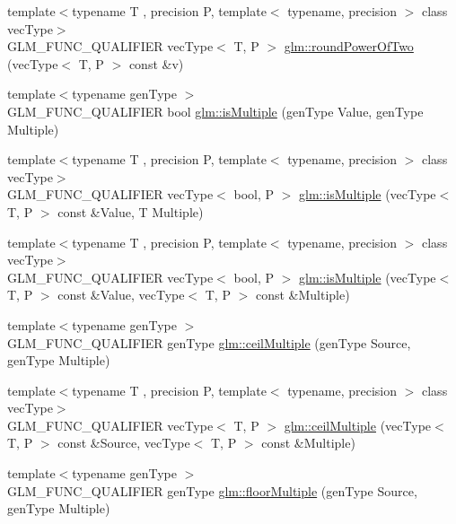 \begin{DoxyCompactItemize}
\item 
{\footnotesize template$<$typename T , precision P, template$<$ typename, precision $>$ class vec\+Type$>$ }\\G\+L\+M\+\_\+\+F\+U\+N\+C\+\_\+\+Q\+U\+A\+L\+I\+F\+I\+E\+R vec\+Type$<$ T, P $>$ \hyperlink{group__gtc__round_gae95be3b384f3bbd00c6c1cf0a1f96485}{glm\+::round\+Power\+Of\+Two} (vec\+Type$<$ T, P $>$ const \&v)
\item 
{\footnotesize template$<$typename gen\+Type $>$ }\\G\+L\+M\+\_\+\+F\+U\+N\+C\+\_\+\+Q\+U\+A\+L\+I\+F\+I\+E\+R bool \hyperlink{namespaceglm_a1749b696a2f7a956da67d67a557ae134}{glm\+::is\+Multiple} (gen\+Type Value, gen\+Type Multiple)
\item 
{\footnotesize template$<$typename T , precision P, template$<$ typename, precision $>$ class vec\+Type$>$ }\\G\+L\+M\+\_\+\+F\+U\+N\+C\+\_\+\+Q\+U\+A\+L\+I\+F\+I\+E\+R vec\+Type$<$ bool, P $>$ \hyperlink{group__gtc__round_ga50ea5d5dc33fffba39ad6002a3784123}{glm\+::is\+Multiple} (vec\+Type$<$ T, P $>$ const \&Value, T Multiple)
\item 
{\footnotesize template$<$typename T , precision P, template$<$ typename, precision $>$ class vec\+Type$>$ }\\G\+L\+M\+\_\+\+F\+U\+N\+C\+\_\+\+Q\+U\+A\+L\+I\+F\+I\+E\+R vec\+Type$<$ bool, P $>$ \hyperlink{group__gtc__round_ga7ae705574ef3e3ebfb4f537d8d285c48}{glm\+::is\+Multiple} (vec\+Type$<$ T, P $>$ const \&Value, vec\+Type$<$ T, P $>$ const \&Multiple)
\item 
{\footnotesize template$<$typename gen\+Type $>$ }\\G\+L\+M\+\_\+\+F\+U\+N\+C\+\_\+\+Q\+U\+A\+L\+I\+F\+I\+E\+R gen\+Type \hyperlink{group__gtc__round_gac84898c466e609cdd2e81d9ba907d9e8}{glm\+::ceil\+Multiple} (gen\+Type Source, gen\+Type Multiple)
\item 
{\footnotesize template$<$typename T , precision P, template$<$ typename, precision $>$ class vec\+Type$>$ }\\G\+L\+M\+\_\+\+F\+U\+N\+C\+\_\+\+Q\+U\+A\+L\+I\+F\+I\+E\+R vec\+Type$<$ T, P $>$ \hyperlink{group__gtc__round_gafe632af669ac57d670ca18e3665a12ca}{glm\+::ceil\+Multiple} (vec\+Type$<$ T, P $>$ const \&Source, vec\+Type$<$ T, P $>$ const \&Multiple)
\item 
{\footnotesize template$<$typename gen\+Type $>$ }\\G\+L\+M\+\_\+\+F\+U\+N\+C\+\_\+\+Q\+U\+A\+L\+I\+F\+I\+E\+R gen\+Type \hyperlink{group__gtc__round_ga9eafb9dbedf84e5cece65c2fe9d5631d}{glm\+::floor\+Multiple} (gen\+Type Source, gen\+Type Multiple)

\end{DoxyCompactItemize}
